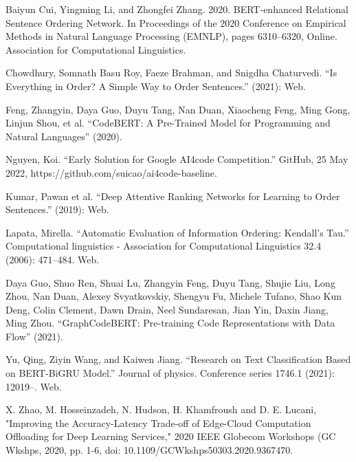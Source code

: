 \documentclass[conference]{IEEEtran}
\begin{document}
\begin{thebibliography}{9}

Baiyun Cui, Yingming Li, and Zhongfei Zhang. 2020. BERT-enhanced Relational Sentence Ordering Network. In Proceedings of the 2020 Conference on Empirical Methods in Natural Language Processing (EMNLP), pages 6310–6320, Online. Association for Computational Linguistics.

Chowdhury, Somnath Basu Roy, Faeze Brahman, and Snigdha Chaturvedi. “Is Everything in Order? A Simple Way to Order Sentences.” (2021): Web.

Feng, Zhangyin, Daya Guo, Duyu Tang, Nan Duan, Xiaocheng Feng, Ming Gong, Linjun Shou, et al. “CodeBERT: A Pre-Trained Model for Programming and Natural Languages” (2020).

Nguyen, Koi. “Early Solution for Google AI4code Competition.” GitHub, 25 May 2022, https://github.com/suicao/ai4code-baseline.

Kumar, Pawan et al. “Deep Attentive Ranking Networks for Learning to Order Sentences.” (2019): Web.

Lapata, Mirella. “Automatic Evaluation of Information Ordering: Kendall’s Tau.” Computational linguistics - Association for Computational Linguistics 32.4 (2006): 471–484. Web.

Daya Guo, Shuo Ren, Shuai Lu, Zhangyin Feng, Duyu Tang, Shujie Liu, Long Zhou, Nan Duan, Alexey Svyatkovskiy, Shengyu Fu, Michele Tufano, Shao Kun Deng, Colin Clement, Dawn Drain, Neel Sundaresan, Jian Yin, Daxin Jiang, Ming Zhou. “GraphCodeBERT: Pre-training Code Representations with Data Flow” (2021).

Yu, Qing, Ziyin Wang, and Kaiwen Jiang. “Research on Text Classification Based on BERT-BiGRU Model.” Journal of physics. Conference series 1746.1 (2021): 12019–. Web.

X. Zhao, M. Hosseinzadeh, N. Hudson, H. Khamfroush and D. E. Lucani, "Improving the Accuracy-Latency Trade-off of Edge-Cloud Computation Offloading for Deep Learning Services," 2020 IEEE Globecom Workshops (GC Wkshps, 2020, pp. 1-6, doi: 10.1109/GCWkshps50303.2020.9367470.

\end{thebibliography}
\end{document}
